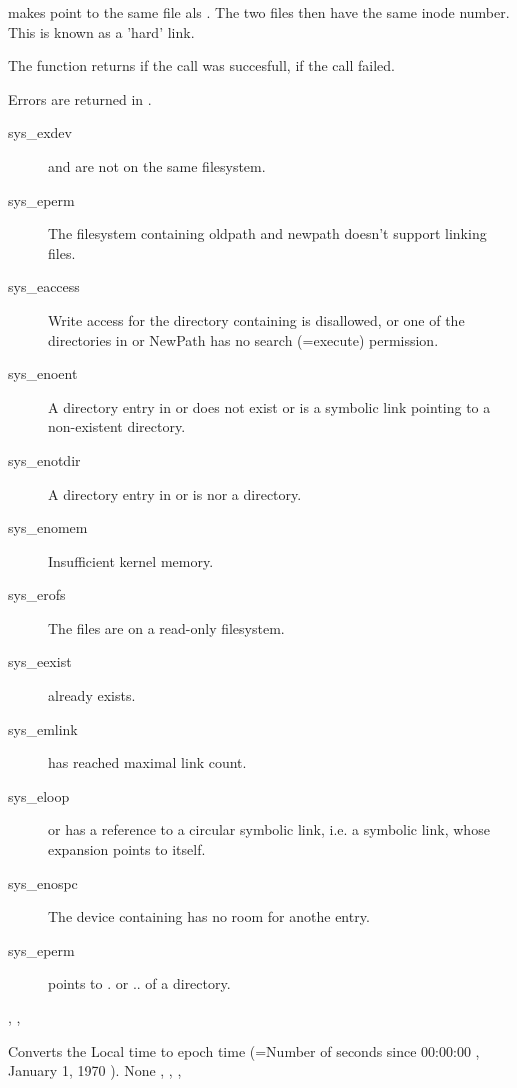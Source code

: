 { makes  point to the same file als . The two files
then have the same inode number. This is known as a 'hard' link.

The function returns  if the call was succesfull,  if the call
failed.
}
{ Errors are returned in .
\begin{description}
\item[sys\_exdev]  and  are not on the same
filesystem.
\item[sys\_eperm] The filesystem containing oldpath and newpath doesn't
support linking files.
\item[sys\_eaccess] Write access for the directory containing 
is disallowed, or one of the directories in  or {NewPath} has no
search (=execute) permission.
\item[sys\_enoent] A directory entry in  or  does
not exist or is a symbolic link pointing to a non-existent directory.
\item[sys\_enotdir] A directory entry in  or  is
nor a directory.
\item[sys\_enomem] Insufficient kernel memory.
\item[sys\_erofs] The files are on a read-only filesystem.
\item[sys\_eexist]  already exists.
\item[sys\_emlink]  has reached maximal link count.
\item[sys\_eloop]  or  has a reference to a circular
symbolic link, i.e. a symbolic link, whose expansion points to itself.
\item[sys\_enospc] The device containing  has no room for anothe
entry.
\item[sys\_eperm]  points to . or .. of a directory.
\end{description}
}
{, ,  }





{
Converts the Local time to epoch time (=Number of seconds since 00:00:00 , January 1,
1970 ).
}
{None}
{, , , }

